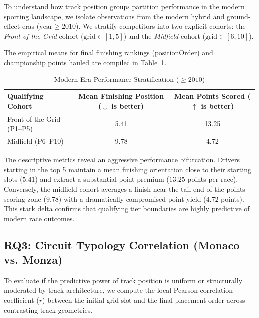 To understand how track position groups partition performance in the modern sporting landscape, we isolate observations from the modern hybrid and ground-effect eras ($\text{year} \ge 2010$). We stratify competitors into two explicit cohorts: the \textit{Front of the Grid} cohort ($\text{grid} \in [1, 5]$) and the \textit{Midfield} cohort ($\text{grid} \in [6, 10]$). 

The empirical means for final finishing rankings ($\text{positionOrder}$) and championship points hauled are compiled in Table~\ref{tab:era_stratification}.

\begin{table}[h!]
\centering
\caption{Modern Era Performance Stratification ($\ge 2010$)}
\label{tab:era_stratification}
\begin{tabular}{lcc}
\toprule
\textbf{Qualifying Cohort} & \textbf{Mean Finishing Position ($\downarrow$ is better)} & \textbf{Mean Points Scored ($\uparrow$ is better)} \\
\midrule
Front of the Grid (P1--P5) & 5.41 & 13.25 \\
Midfield (P6--P10)         & 9.78 &  4.72 \\
\bottomrule
\end{tabular}
\end{table}

The descriptive metrics reveal an aggressive performance bifurcation. Drivers starting in the top 5 maintain a mean finishing orientation close to their starting slots ($5.41$) and extract a substantial point premium ($13.25$ points per race). Conversely, the midfield cohort averages a finish near the tail-end of the points-scoring zone ($9.78$) with a dramatically compromised point yield ($4.72$ points). This stark delta confirms that qualifying tier boundaries are highly predictive of modern race outcomes.

\subsection{RQ3: Circuit Typology Correlation (Monaco vs. Monza)}
\label{subsec:rq3_correlation}

To evaluate if the predictive power of track position is uniform or structurally moderated by track architecture, we compute the local Pearson correlation coefficient ($r$) between the initial grid slot and the final placement order across contrasting track geometries. 

